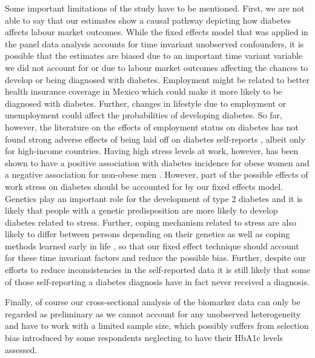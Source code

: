 Some important limitations of the study have to be mentioned. First,
we are not able to say that our estimates show a causal pathway depicting
how diabetes affects labour market outcomes. While the fixed
effects model that was applied in the panel data analysis accounts for time invariant
unobserved confounders, it is possible that the estimates are biased
due to an important time variant variable we did not account for or
due to labour market outcomes affecting the chances to develop or
being diagnosed with diabetes. Employment might be related to better
health insurance coverage in Mexico which could make it more likely
to be diagnosed with diabetes. Further, changes in lifestyle due to
employment or unemployment could affect the probabilities of developing
diabetes. So far, however, the literature on the effects of employment
status on diabetes has not found strong adverse effects of being laid
off on diabetes self-reports \citep{Bergemann2011,Schaller2014},
albeit only for high-income countries. Having high stress levels at
work, however, has been shown to have a positive association with
diabetes incidence for obese women and a negative association for
non-obese men \citep{Heraclides2012,Eriksson2013}. However, part
of the possible effects of work stress on diabetes should be accounted
for by our fixed effects model. Genetics play an important role for
the development of type 2 diabetes and it is likely that people with
a genetic predisposition are more likely to develop diabetes related
to stress. Further, coping mechanism related to stress are also likely
to differ between persons depending on their genetics as well as coping
methods learned early in life \citep{Schneiderman2005}, so that our
fixed effect technique should account for these time invariant factors
and reduce the possible bias. Further, despite our efforts to reduce inconsistencies in the self-reported
data it is still likely that some of those self-reporting a diabetes
diagnosis have in fact never received a diagnosis.

Finally, of course our cross-sectional analysis of the biomarker data
can only be regarded as preliminary as we cannot account for any unobserved
heterogeneity and have to work with a limited sample size, which
possibly suffers from selection bias introduced by some respondents neglecting
to have their \ac{HbA1c} levels assessed.

